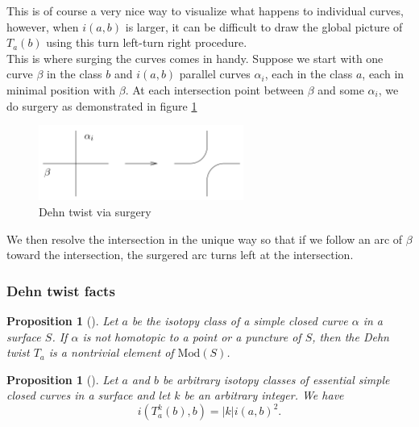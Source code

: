 \documentclass[reqno]{amsart}
\newtheorem{proposition}[theorem]{Proposition}
\theoremstyle{definition}
\theoremstyle{remark}
\newcommand{\Mod}{{\mathrm{Mod}}}
\begin{document}
This is of course a very nice way to visualize what happens to
individual curves, however, when $i \left( a,b \right) $ is
larger, it can be difficult to draw the global picture
of $T_a (b)$ using this turn left-turn right procedure.\\

This is where surging the curves comes in handy. Suppose
we start with one curve $\beta$ in the class $b$ and
$i \left( a,b \right) $ parallel curves $\alpha_i$, each in
the class $a$, each in minimal position with
$\beta$. At each intersection point between $\beta$ and
some $\alpha_i$, we do surgery as demonstrated in figure
\ref{fig:dehn-twist-via-surgery-png}

\begin{figure}[H]
    \centering
    \includegraphics[width=0.6\textwidth]{dehn-twist-via-surgery.png}
    \caption{Dehn twist via surgery}
    \label{fig:dehn-twist-via-surgery-png}
\end{figure}

We then resolve the intersection in the unique way so that
if we follow an arc of $\beta$ toward the intersection, the 
surgered arc turns left at the intersection.



\subsubsection{Dehn twist facts}


\begin{proposition}[]
    Let $a$ be the isotopy class of a simple closed curve
    $\alpha$ in a surface $S$. If $\alpha$ is not
    homotopic to a point or a puncture of $S$, then the
    Dehn twist $T_a$ is a nontrivial element of $\Mod(S)$.
\end{proposition}

\begin{proposition}[]\label{dehn-twist-formula}
    Let $a$ and $b$ be arbitrary isotopy classes of essential
    simple closed curves in a surface and let $k$ be
    an arbitrary integer. We have
    \[
    i \left( T_{a}^{k}(b), b \right) =
    \left| k \right| i\left( a,b \right)^2.
    \] 
\end{proposition}
\end{document}
